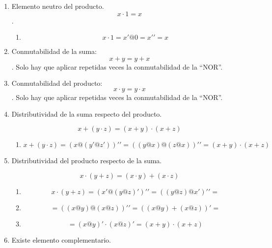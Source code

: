 \documentclass[
]{article}
\providecommand{\tightlist}{%
  \setlength{\itemsep}{0pt}\setlength{\parskip}{0pt}}
\begin{document}
\begin{enumerate}
\begin{enumerate}
\begin{enumerate}
\begin{enumerate}
\begin{enumerate}
          \begin{enumerate}
          \def\labelenumvi{\arabic{enumvi}.}
          \tightlist
          \item
            \[{{x + 0} = {({x@0})}}{' = {({x@0})}}@{{({x@x'})} =}\]
          \item
            \[{= {({x@0})}}@{0 = x}'@{0 = x}'{' = x}\]
          \end{enumerate}
        \item
          Elemento neutro del producto. \[{x \cdot 1} = x\].

          \begin{enumerate}
          \def\labelenumvi{\arabic{enumvi}.}
          \tightlist
          \item
            \[{{{x \cdot 1} = {x'@0}} = x}'{' = x}\]
          \end{enumerate}
        \item
          Conmutabilidad de la suma: \[{x + y} = {y + x}\]. Solo hay que
          aplicar repetidas veces la conmutabilidad de la ``NOR''.
        \item
          Conmutabilidad del producto: \[{x \cdot y} = {y \cdot x}\].
          Solo hay que aplicar repetidas veces la conmutabilidad de la
          ``NOR''.
        \item
          Distributividad de la suma respecto del producto.

          \[{x + {({y \cdot z})}} = {{({x + y})} \cdot {({x + z})}}\]

          \begin{enumerate}
          \def\labelenumvi{\arabic{enumvi}.}
          \tightlist
          \item
            \[{{x + {({y \cdot z})}} = {({x@{({y'@z'})}})}}'{' = {({{({y@x})}@{({z@x})}})}}'{' = {{({x + y})} \cdot {({x + z})}}}\]
          \end{enumerate}
        \item
          Distributividad del producto respecto de la suma.

          \[{x \cdot {({y + z})}} = {{({x \cdot y})} + {({x \cdot z})}}\]

          \begin{enumerate}
          \def\labelenumvi{\arabic{enumvi}.}
          \tightlist
          \item
            \[{{x \cdot {({y + z})}} = {({{x'}@{({y@z})}'})}}'{' = {({{({y@z})}@{x'}})}}'{' =}\]
          \item
            \[{= {({{({x@y})}@{({x@z})}})}}'{' = {({{({x@y})} + {({x@z})}})}}{' =}\]
          \item
            \[{= {({x@y})}}{' \cdot {({x@z})}}{' = {{({x + y})} \cdot {({x + z})}}}\]
          \end{enumerate}
        \item
          Existe elemento complementario.


\end{enumerate}
\end{enumerate}
\end{enumerate}
\end{enumerate}
\end{enumerate}
\end{document}
